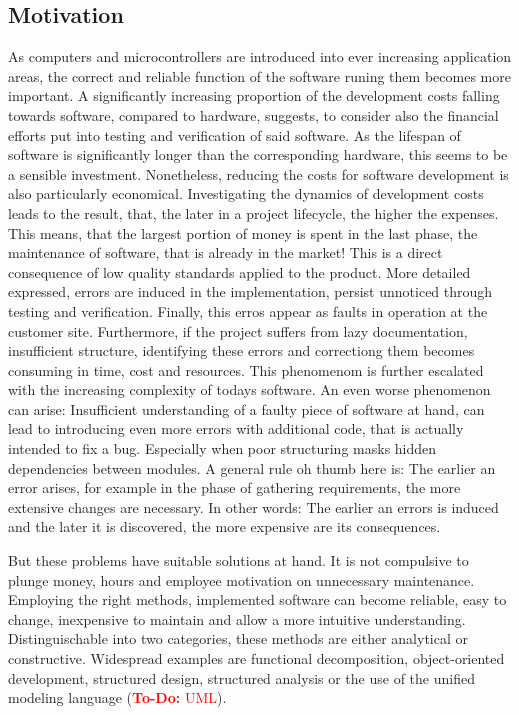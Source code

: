 \documentclass[master,english,smartquotes,apa]{hgbthesis}
\newcommand{\TODO}[1]{\textcolor{red}{\textbf{To-Do:} #1}}
\begin{document}
	\subsection{Motivation}
As computers and microcontrollers are introduced into ever increasing application areas, the correct and reliable function of the software runing them becomes more important. A significantly increasing proportion of the development costs falling towards software, compared to hardware, suggests, to consider also the financial efforts put into testing and verification of said software. As the lifespan of software is significantly longer than the corresponding hardware, this seems to be a sensible investment. Nonetheless, reducing the costs for software development is also particularly economical. Investigating the dynamics of development costs leads to the result, that, the later in a project lifecycle, the higher the expenses. This means, that the largest portion of money is spent in the last phase, the maintenance of software, that is already in the market! This is a direct consequence of low quality standards applied to the product. More detailed expressed, errors are induced in the implementation, persist unnoticed through testing and verification. Finally, this erros appear as faults in operation at the customer site. Furthermore, if the project suffers from lazy documentation, insufficient structure, identifying these errors and correctiong them becomes consuming in time, cost and resources. This phenomenom is further escalated with the increasing complexity of todays software. An even worse phenomenon can arise: Insufficient understanding of a faulty piece of software at hand, can lead to introducing even more errors with additional code, that is actually intended to fix a bug. Especially when poor structuring masks hidden dependencies between modules. A general rule oh thumb here is: The earlier an error arises, for example in the phase of gathering requirements, the more extensive changes are necessary. In other words: The earlier an errors is induced and the later it is discovered, the more expensive are its consequences. 

But these problems have suitable solutions at hand. It is not compulsive to plunge money, hours and employee motivation on unnecessary maintenance. Employing the right methods, implemented software can become reliable, easy to change, inexpensive to maintain and allow a more intuitive understanding. Distinguischable into two categories, these methods are either analytical or constructive. Widespread examples are functional decomposition, object-oriented development, structured design, structured analysis or the use of the unified modeling language (\TODO{UML}).
\end{document}
